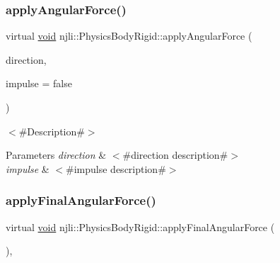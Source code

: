 \subsubsection{\texorpdfstring{apply\+Angular\+Force()}{applyAngularForce()}}
{\footnotesize\ttfamily virtual \mbox{\hyperlink{_thread_8h_af1e856da2e658414cb2456cb6f7ebc66}{void}} njli\+::\+Physics\+Body\+Rigid\+::apply\+Angular\+Force (\begin{DoxyParamCaption}\item[{const bt\+Vector3 \&}]{direction,  }\item[{bool}]{impulse = {\ttfamily false} }\end{DoxyParamCaption})\hspace{0.3cm}{\ttfamily [virtual]}}

$<$\#\+Description\#$>$


\begin{DoxyParams}{Parameters}
{\em direction} & $<$\#direction description\#$>$ \\
\hline
{\em impulse} & $<$\#impulse description\#$>$ \\
\hline
\end{DoxyParams}
\mbox{\label{classnjli_1_1_physics_body_rigid_aa8971d87ad91419622dd6438ee00f58c}} 
\subsubsection{\texorpdfstring{apply\+Final\+Angular\+Force()}{applyFinalAngularForce()}}
{\footnotesize\ttfamily virtual \mbox{\hyperlink{_thread_8h_af1e856da2e658414cb2456cb6f7ebc66}{void}} njli\+::\+Physics\+Body\+Rigid\+::apply\+Final\+Angular\+Force (\begin{DoxyParamCaption}{ }\end{DoxyParamCaption})\hspace{0.3cm}{\ttfamily [protected]}, {\ttfamily [virtual]}}

\mbox{\label{classnjli_1_1_physics_body_rigid_a46509fb78aac02dc21c6f801b1f61bf1}} 

